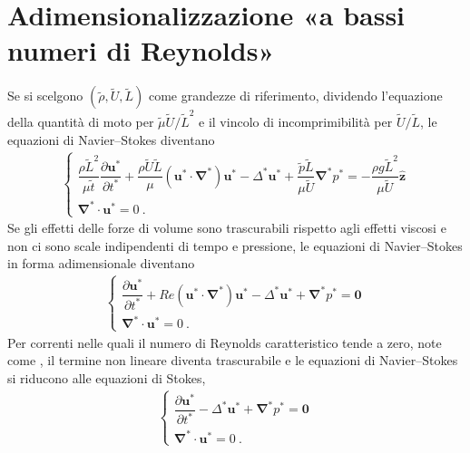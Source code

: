 \documentclass[letterpaper,10pt,italian]{jupyterBook}
\begin{document}
\section{Adimensionalizzazione «a bassi numeri di Reynolds»}
\label{\detokenize{polimi/fluidmechanics-ita/template/capitoli/07_similitudine/07teoria:adimensionalizzazione-a-bassi-numeri-di-reynolds}}
\sphinxAtStartPar
Se si scelgono \((\tilde{\rho},\tilde{U},\tilde{L})\) come grandezze di
riferimento, dividendo l’equazione della quantità di moto per
\(\tilde{\mu} \tilde{U} / \tilde{L}^2\) e il vincolo di incomprimibilità
per \(\tilde{U} / \tilde{L}\), le equazioni di Navier–Stokes diventano
\begin{equation*}
\begin{split}\begin{cases}
 \dfrac{\rho\tilde{L}^2}{\mu \tilde{t}} \dfrac{\partial \mathbf{u}^*}{\partial t^*} + \dfrac{\rho \tilde{U} \tilde{L}}{\mu}(\mathbf{u}^* \cdot \mathbf{\nabla}^*) \mathbf{u}^* - \Delta^* \mathbf{u}^* + \dfrac{\tilde{p}\tilde{L}}{\mu \tilde{U}} \mathbf{\nabla}^* p^* = -\dfrac{\rho g\tilde{L}^2}{\mu \tilde{U}} \mathbf{\hat{z}} \\
 \mathbf{\nabla}^* \cdot \mathbf{u}^* = 0 \ .
\end{cases}\end{split}
\end{equation*}
\sphinxAtStartPar
Se gli effetti delle forze di volume sono trascurabili
rispetto agli effetti viscosi e non ci sono scale indipendenti di tempo
e pressione, le equazioni di Navier–Stokes in forma adimensionale
diventano
\begin{equation*}
\begin{split}\begin{cases}
 \dfrac{\partial \mathbf{u}^*}{\partial t^*} + Re (\mathbf{u}^* \cdot \mathbf{\nabla}^*) \mathbf{u}^* - \Delta^* \mathbf{u}^* + \mathbf{\nabla}^* p^* = \mathbf{0} \\
 \mathbf{\nabla}^* \cdot \mathbf{u}^* = 0 \ .
\end{cases}\end{split}
\end{equation*}
\sphinxAtStartPar
Per correnti nelle quali il numero di Reynolds
caratteristico tende a zero, note come , il termine non
lineare diventa trascurabile e le equazioni di Navier–Stokes si
riducono alle equazioni di Stokes,
\begin{equation*}
\begin{split}\begin{cases}
 \dfrac{\partial \mathbf{u}^*}{\partial t^*} - \Delta^* \mathbf{u}^* + \mathbf{\nabla}^* p^* = \mathbf{0} \\
 \mathbf{\nabla}^* \cdot \mathbf{u}^* = 0 \ .
\end{cases}\end{split}
\end{equation*}
\end{document}
